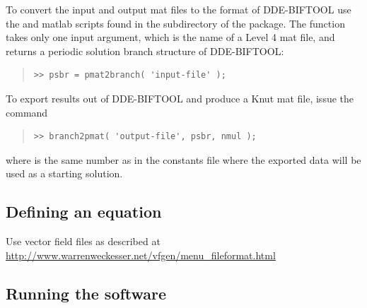 \documentclass[10pt,a4paper]{ddedoc}
\def\knut{Knut}
\begin{document}
To convert the input and output {\sc{}mat} files to the format of DDE-BIFTOOL use the
 and  {\sc{}matlab} scripts found in the 
subdirectory of the package. The function  takes only one 
input argument, which is the name of a Level 4 {\sc{}mat} file, and returns a periodic 
solution branch structure of DDE-BIFTOOL:
{ \small \begin{quote} \begin{lstlisting}[frame=single]
>> psbr = pmat2branch( 'input-file' );
\end{lstlisting} \end{quote} } \noindent
To export results out of DDE-BIFTOOL and produce a \knut{} {\sc{}mat} file, issue the command
{ \small \begin{quote} \begin{lstlisting}[frame=single]
>> branch2pmat( 'output-file', psbr, nmul );
\end{lstlisting} \end{quote} } \noindent
where  is the same number as in the constants file where the exported data 
will be used as a starting solution.

\subsection{Defining an equation}

Use vector field files as described at \url{http://www.warrenweckesser.net/vfgen/menu_fileformat.html}

\subsection{Running the software}
\end{document}
